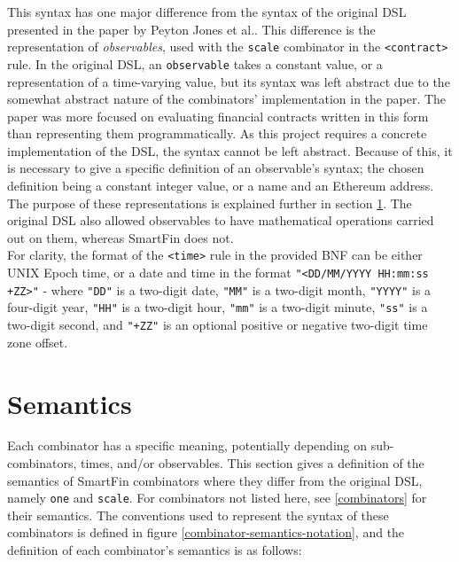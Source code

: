 This syntax has one major difference from the syntax of the original DSL presented in the paper by Peyton Jones et al.\cite{SPJ}. This difference is the representation of \textit{observables}, used with the \texttt{scale} combinator in the \texttt{<contract>} rule. In the original DSL, an \texttt{observable} takes a constant value, or a representation of a time-varying value, but its syntax was left abstract due to the somewhat abstract nature of the combinators' implementation in the paper. The paper was more focused on evaluating financial contracts written in this form than representing them programmatically. As this project requires a concrete implementation of the DSL, the syntax cannot be left abstract. Because of this, it is necessary to give a specific definition of an observable's syntax; the chosen definition being a constant integer value, or a name and an Ethereum address. The purpose of these representations is explained further in section \ref{DSL-semantics}. The original DSL also allowed observables to have mathematical operations carried out on them, whereas SmartFin does not. \\

For clarity, the format of the \texttt{<time>} rule in the provided BNF can be either UNIX Epoch time, or a date and time in the format \texttt{"<DD/MM/YYYY HH:mm:ss +ZZ>"} - where \texttt{"DD"} is a two-digit date, \texttt{"MM"} is a two-digit month, \texttt{"YYYY"} is a four-digit year, \texttt{"HH"} is a two-digit hour, \texttt{"mm"} is a two-digit minute, \texttt{"ss"} is a two-digit second, and \texttt{"+ZZ"} is an optional positive or negative two-digit time zone offset.


\section{Semantics} \label{DSL-semantics}

Each combinator has a specific meaning, potentially depending on sub-combinators, times, and/or observables. This section gives a definition of the semantics of SmartFin combinators where they differ from the original DSL, namely \texttt{one} and \texttt{scale}. For combinators not listed here, see \ref{combinators} for their semantics. The conventions used to represent the syntax of these combinators is defined in figure \ref{combinator-semantics-notation}, and the definition of each combinator's semantics is as follows: \\


